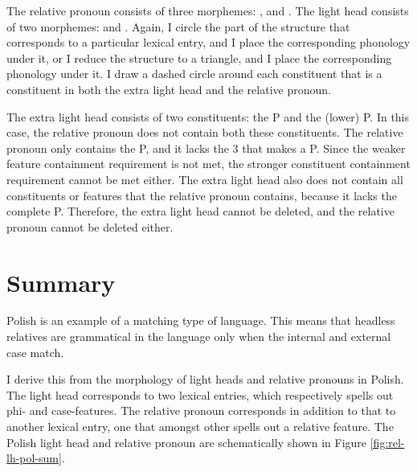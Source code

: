 The relative pronoun consists of three morphemes: ,  and .
The light head consists of two morphemes:  and .
Again, I circle the part of the structure that corresponds to a particular lexical entry, and I place the corresponding phonology under it, or I reduce the structure to a triangle, and I place the corresponding phonology under it.
I draw a dashed circle around each constituent that is a constituent in both the extra light head and the relative pronoun.

The extra light head consists of two constituents: the P and the (lower) P.
In this case, the relative pronoun does not contain both these constituents. The relative pronoun only contains the P, and it lacks the 3 that makes a P. Since the weaker feature containment requirement is not met, the stronger constituent containment requirement cannot be met either.
The extra light head also does not contain all constituents or features that the relative pronoun contains, because it lacks the complete P.
Therefore, the extra light head cannot be deleted, and the relative pronoun cannot be deleted either.

\section{Summary}

Polish is an example of a matching type of language. This means that headless relatives are grammatical in the language only when the internal and external case match.

I derive this from the morphology of light heads and relative pronouns in Polish. The light head corresponds to two lexical entries, which respectively spells out phi- and case-features. The relative pronoun corresponds in addition to that to another lexical entry, one that amongst other spells out a relative feature. The Polish light head and relative pronoun are schematically shown in Figure \ref{fig:rel-lh-pol-sum}.

